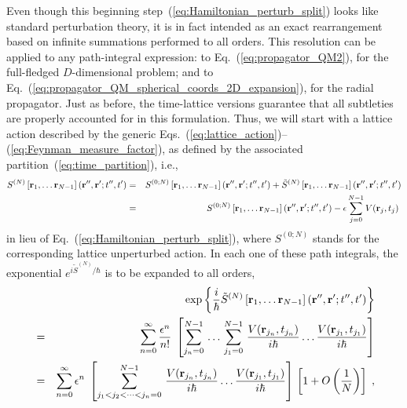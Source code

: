 \documentclass[a4paper,preprint,draft,showpacs,amsmath,amsfonts,amssymb,aps,prd]{revtex4}%
\begin{document}
Even though this beginning step~(\ref{eq:Hamiltonian_perturb_split})
looks like standard perturbation theory, it is
in fact intended as an exact rearrangement based on infinite summations 
performed to all orders. 
This resolution can be applied to any path-integral expression:
to Eq.~(\ref{eq:propagator_QM2}), for the full-fledged $D$-dimensional problem;
 and to Eq.~(\ref{eq:propagator_QM_spherical_coords_2D_expansion}),
for the radial propagator.
Just as before,  the time-lattice versions guarantee that all subtleties are 
properly accounted for in this formulation. Thus, we will start 
with a lattice action described by the
generic Eqs.~(\ref{eq:lattice_action})--(\ref{eq:Feynman_measure_factor}),
as defined by the associated partition~(\ref{eq:time_partition}),
i.e.,
\begin{eqnarray}
S^{(N)}  
 \left[ 
{\bf r}_{1},
\dots
{\bf r}_{N-1}
\right]  ({\bf r}'', {\bf r}' ; t'',t')  
& = &
S^{(0;N)}   
 \left[ 
{\bf r}_{1},
\dots
{\bf r}_{N-1}
\right]  ({\bf r}'', {\bf r}' ; t'',t')  
+
\tilde{S}^{(N)}  
 \left[ 
{\bf r}_{1},
\dots
{\bf r}_{N-1}
\right]  ({\bf r}'', {\bf r}' ; t'',t')  
\nonumber \\
& = &
S^{(0;N)}   
 \left[ 
{\bf r}_{1},
\dots
{\bf r}_{N-1}
\right]  ({\bf r}'', {\bf r}' ; t'',t')  
- \epsilon
\sum_{j = 0}^{N-1} 
V({\bf r}_{j},t_{j})
\;  
\label{eq:Hamiltonian_perturb_split_lattice}
\end{eqnarray}
in lieu of Eq.~(\ref{eq:Hamiltonian_perturb_split}),
where $S^{(0;N)}   $ 
stands for the corresponding lattice unperturbed action.
In each one of these path integrals,
the exponential $e^{i\tilde{S}^{(N)}/\hbar}$ is to be expanded
to all orders,
\begin{eqnarray}
&  & 
\exp
\left\{
\frac{i}{\hbar}
\tilde{S}^{(N)}  
 \left[ 
{\bf r}_{1},
\dots
{\bf r}_{N-1}
\right]  ({\bf r}'', {\bf r}' ; t'',t') 
\right\}
 \nonumber 
\\
& = &
\sum_{n=0}^{\infty}
\frac{\epsilon^{n}}{n!}
\;
\left[
\sum_{j_{n}=0}^{N-1}
\,
\ldots
\,
\sum_{j_{1}=0}^{N-1}
\,
\frac{ V( {\bf r}_{j_{n}}, t_{j_{n}} ) }{i \hbar}
\ldots
\frac{ V( {\bf r}_{j_{1}}, t_{j_{1}} ) }{i \hbar}
\right]
\nonumber
\\
 & = &
\sum_{n=0}^{\infty}
\epsilon^{n}
\;
\left[
\sum^{N-1}_{ %
          j_{1} < j_{2} <  \dots  < j_{n} =0 }
\,
\frac{ V( {\bf r}_{j_{n}}, t_{j_{n}} ) }{i \hbar}
\ldots
\frac{ V( {\bf r}_{j_{1}}, t_{j_{1}} ) }{i \hbar}
\right]
\,
\left[ 1 + O \left( \frac{1}{N} \right) \right]
\;  ,
\label{eq:perturbation_potential_expansion}
\end{eqnarray}
\end{document}
